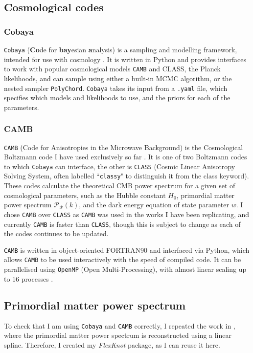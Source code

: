 \documentclass{article}
\begin{document}
\subsection{Cosmological codes}

\subsubsection{Cobaya}
\texttt{Cobaya} (\textbf{Co}de for \textbf{bay}esian \textbf{a}nalysis) is a sampling and modelling framework, intended for use with cosmology \cite{Cobaya}. It is written in Python and provides interfaces to work with popular cosmological models \texttt{CAMB} and CLASS, the Planck likelihoods, and can sample using either a built-in MCMC algorithm, or the nested sampler \texttt{PolyChord}. \texttt{Cobaya} takes its input from a \texttt{.yaml} file, which specifies which models and likelihoods to use, and the priors for each of the parameters. 

\subsubsection{CAMB}
\texttt{CAMB} (Code for Anisotropies in the Microwave Background) is the Cosmological Boltzmann code I have used exclusively so far \cite{CAMB_1, CAMB_2}. It is one of two Boltzmann codes to which \texttt{Cobaya} can interface, the other is \texttt{CLASS} (Cosmic Linear Anisotropy Solving System, often labelled ``\texttt{classy}" to distinguish it from the class keyword). These codes calculate the theoretical CMB power spectrum for a given set of cosmological parameters, such as the Hubble constant $H_0$, primordial matter power spectrum $\mathcal P_\mathcal R(k)$, and the dark energy equation of state parameter $w$. I chose \texttt{CAMB} over \texttt{CLASS} as \texttt{CAMB} was used in the works I have been replicating, and currently \texttt{CAMB} is faster than \texttt{CLASS}, though this is subject to change as each of the codes continues to be updated.

\texttt{CAMB} is written in object-oriented FORTRAN90 and interfaced via Python, which allows \texttt{CAMB} to be used interactively with the speed of compiled code. It can be parallelised using \texttt{OpenMP} (Open Multi-Processing), with almost linear scaling up to 16 processes \cite{camb_mp}. 

\subsection{Primordial matter power spectrum}
To check that I am using \texttt{Cobaya} and \texttt{CAMB} correctly, I repeated the work in \cite{Handley2019}, where the primordial matter power spectrum is reconstructed using a linear spline. Therefore, I created my \textit{FlexKnot} package, as I can reuse it here.
\end{document}
